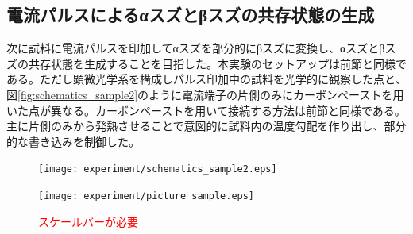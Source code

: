 \subsection{電流パルスによるαスズとβスズの共存状態の生成}
次に試料に電流パルスを印加してαスズを部分的にβスズに変換し、αスズとβスズの共存状態を生成することを目指した。本実験のセットアップは前節と同様である。ただし顕微光学系を構成しパルス印加中の試料を光学的に観察した点と、図\ref{fig:schematics_sample2}のように電流端子の片側のみにカーボンペーストを用いた点が異なる。カーボンペーストを用いて接続する方法は前節と同様である。主に片側のみから発熱させることで意図的に試料内の温度勾配を作り出し、部分的な書き込みを制御した。
\begin{figure}[!h]
 \begin{minipage}{0.4\hsize}
    \begin{center}
   \texttt{[image: experiment/schematics\_sample2.eps]}
  \end{center}
  \caption{}
  \label{fig:schematics_sample2}
 \end{minipage}
 \begin{minipage}{0.5\hsize}
     \begin{center}
   \texttt{[image: experiment/picture\_sample.eps]}
  \end{center}
  \caption{ \textcolor{red}{スケールバーが必要}}
  \label{fig:picture_sample}
   \end{minipage}
\end{figure}


\clearpage

